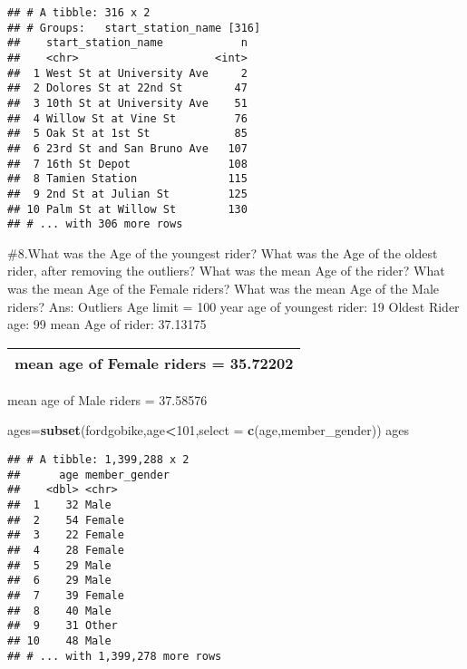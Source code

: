 \documentclass[]{article}
\newenvironment{Shaded}{\begin{snugshade}}{\end{snugshade}}
\newcommand{\DataTypeTok}[1]{\textcolor[rgb]{0.13,0.29,0.53}{#1}}
\newcommand{\DecValTok}[1]{\textcolor[rgb]{0.00,0.00,0.81}{#1}}
\newcommand{\KeywordTok}[1]{\textcolor[rgb]{0.13,0.29,0.53}{\textbf{#1}}}
\newcommand{\NormalTok}[1]{#1}
\newcommand{\OperatorTok}[1]{\textcolor[rgb]{0.81,0.36,0.00}{\textbf{#1}}}
\begin{document}
\begin{verbatim}
## # A tibble: 316 x 2
## # Groups:   start_station_name [316]
##    start_station_name            n
##    <chr>                     <int>
##  1 West St at University Ave     2
##  2 Dolores St at 22nd St        47
##  3 10th St at University Ave    51
##  4 Willow St at Vine St         76
##  5 Oak St at 1st St             85
##  6 23rd St and San Bruno Ave   107
##  7 16th St Depot               108
##  8 Tamien Station              115
##  9 2nd St at Julian St         125
## 10 Palm St at Willow St        130
## # ... with 306 more rows
\end{verbatim}

\#8.What was the Age of the youngest rider? What was the Age of the
oldest rider, after removing the outliers? What was the mean Age of the
rider? What was the mean Age of the Female riders? What was the mean Age
of the Male riders? Ans: Outliers Age limit = 100 year age of youngest
rider: 19 Oldest Rider age: 99 mean Age of rider: 37.13175

\begin{longtable}[]{@{}l@{}}
\toprule
\endhead
\begin{minipage}[t]{0.11\columnwidth}\raggedright
mean age of Female riders = 35.72202\strut
\end{minipage}\tabularnewline
\bottomrule
\end{longtable}

mean age of Male riders = 37.58576

\begin{Shaded}
\begin{Highlighting}[]
\NormalTok{ages=}\KeywordTok{subset}\NormalTok{(fordgobike,age}\OperatorTok{<}\DecValTok{101}\NormalTok{,}\DataTypeTok{select =} \KeywordTok{c}\NormalTok{(age,member_gender))}
\NormalTok{ages}
\end{Highlighting}
\end{Shaded}

\begin{verbatim}
## # A tibble: 1,399,288 x 2
##      age member_gender
##    <dbl> <chr>        
##  1    32 Male         
##  2    54 Female       
##  3    22 Female       
##  4    28 Female       
##  5    29 Male         
##  6    29 Male         
##  7    39 Female       
##  8    40 Male         
##  9    31 Other        
## 10    48 Male         
## # ... with 1,399,278 more rows
\end{verbatim}

\begin{Shaded}
\end{Shaded}
\end{document}
